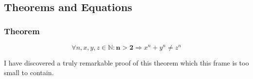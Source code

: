 \documentclass[aspectratio=169]{beamer}
\begin{document}
\subsection{Theorems and Equations}


\begin{frame}
\frametitle{Theorem}
\begin{theorem}
\begin{equation}
    \forall n, x, y, z \in \mathbb{N}: \mathbf{n > 2} \Rightarrow x^n + y^n \neq z^n
\end{equation}
\end{theorem}
I have discovered a truly remarkable proof of this theorem which this frame is too small to contain.
\end{frame}


\end{document}

